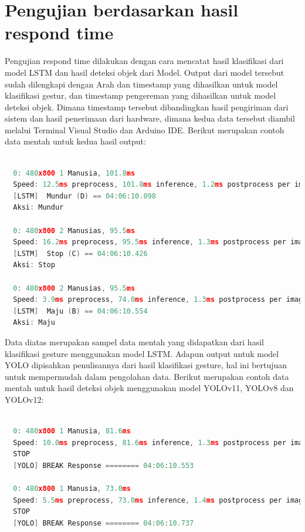 \section{Pengujian berdasarkan hasil respond time}
Pengujian respond time dilakukan dengan cara mencatat hasil klasifikasi dari model LSTM dan hasil deteksi objek dari Model. Output dari model tersebut sudah dilengkapi dengan Arah dan timestamp yang dihasilkan untuk model klasifikasi gestur, dan timestamp pengereman yang dihasilkan untuk model deteksi objek. Dimana timestamp tersebut dibandingkan hasil pengiriman dari sistem dan hasil penerimaan dari hardware, dimana kedua data tersebut diambil melalui Terminal Visual Studio dan Arduino IDE. Berikut merupakan contoh data mentah untuk kedua hasil output: 

\begin{lstlisting}[language=c]
  
  0: 480x800 1 Manusia, 101.8ms
  Speed: 12.5ms preprocess, 101.8ms inference, 1.2ms postprocess per image at shape (1, 3, 480, 800)
  [LSTM]  Mundur (D) == 04:06:10.098
  Aksi: Mundur

  0: 480x800 2 Manusias, 95.5ms
  Speed: 16.2ms preprocess, 95.5ms inference, 1.3ms postprocess per image at shape (1, 3, 480, 800)
  [LSTM]  Stop (C) == 04:06:10.426
  Aksi: Stop

  0: 480x800 2 Manusias, 95.5ms
  Speed: 3.9ms preprocess, 74.0ms inference, 1.3ms postprocess per image at shape (1, 3, 480, 800)
  [LSTM]  Maju (B) == 04:06:10.554
  Aksi: Maju

\end{lstlisting}

Data diatas merupakan sampel data mentah yang didapatkan dari hasil klasifikasi gesture menggunakan model LSTM. Adapun output untuk model YOLO dipisahkan penulisannya dari hasil klasifikasi gesture, hal ini bertujuan untuk mempermudah dalam pengolahan data. Berikut merupakan contoh data mentah untuk hasil deteksi objek menggunakan model YOLOv11, YOLOv8 dan YOLOv12:

\begin{lstlisting}[language=c]
  
  0: 480x800 1 Manusia, 81.6ms
  Speed: 10.0ms preprocess, 81.6ms inference, 1.3ms postprocess per image at shape (1, 3, 480, 800)
  STOP
  [YOLO] BREAK Response ======== 04:06:10.553
  
  0: 480x800 1 Manusia, 73.0ms
  Speed: 5.5ms preprocess, 73.0ms inference, 1.4ms postprocess per image at shape (1, 3, 480, 800)
  STOP 
  [YOLO] BREAK Response ======== 04:06:10.737

\end{lstlisting}

